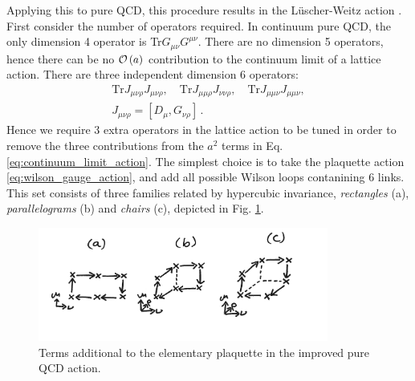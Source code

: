 Applying this to pure QCD, this procedure results in the L\"uscher-Weitz action \cite{luscher1985}. First consider the number of operators required. In continuum pure QCD, the only dimension 4 operator is Tr$G_{\mu\nu}G^{\mu\nu}$. There are no dimension 5 operators, hence there can be no $\mathcal{O}\left( a \right)$ contribution to the continuum limit of a lattice action. There are three independent dimension 6 operators:
\begin{gather}
  \text{Tr} J_{\mu\nu\rho} J_{\mu\nu\rho} ,\quad
  \text{Tr} J_{\mu\mu\rho} J_{\nu\nu\rho} ,\quad
  \text{Tr} J_{\mu\mu\nu} J_{\mu\mu\nu}, \\
  J_{\mu\nu\rho} = [ D_{\mu}, G_{\nu\rho} ]\,. \nonumber
\end{gather}
Hence we require 3 extra operators in the lattice action to be tuned in order to remove the three contributions from the $a^2$ terms in Eq. \eqref{eq:continuum_limit_action}. The simplest choice is to take the plaquette action \eqref{eq:wilson_gauge_action}, and add all possible Wilson loops contanining 6 links. This set consists of three families related by hypercubic invariance, {\it{rectangles}} (a), {\it{parallelograms}} (b) and {\it{chairs}} (c), depicted in Fig. \ref{fig:LuscherWeitz}.

\begin{figure}
  \begin{center}
    \vspace{-10pt}
    \includegraphics[width=0.85\textwidth]{images/LuscherWeitz.jpg}
    \vspace{-10pt}
    \caption{Terms additional to the elementary plaquette in the improved pure QCD action. \label{fig:LuscherWeitz}}
    \vspace{-10pt}
  \end{center}
\end{figure}

